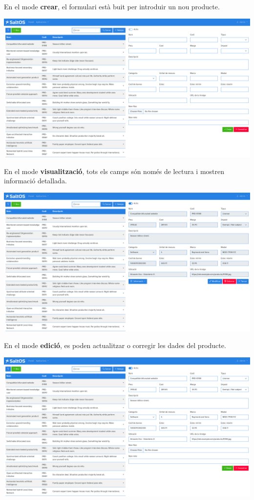 \documentclass[a4paper]{article}
\begin{document}
En el mode \textbf{crear}, el formulari està buit per introduir un nou producte.

\begin{center}\includegraphics[width=1\textwidth]{../ujest/snaps/test-screenshots-js-screenshots-sales-products-create-ca-es-1-snap.png}\end{center}

En el mode \textbf{visualització}, tots els camps són només de lectura i mostren informació detallada.

\begin{center}\includegraphics[width=1\textwidth]{../ujest/snaps/test-screenshots-js-screenshots-sales-products-view-100-ca-es-1-snap.png}\end{center}

En el mode \textbf{edició}, es poden actualitzar o corregir les dades del producte.

\begin{center}\includegraphics[width=1\textwidth]{../ujest/snaps/test-screenshots-js-screenshots-sales-products-edit-100-ca-es-1-snap.png}\end{center}
\end{document}
